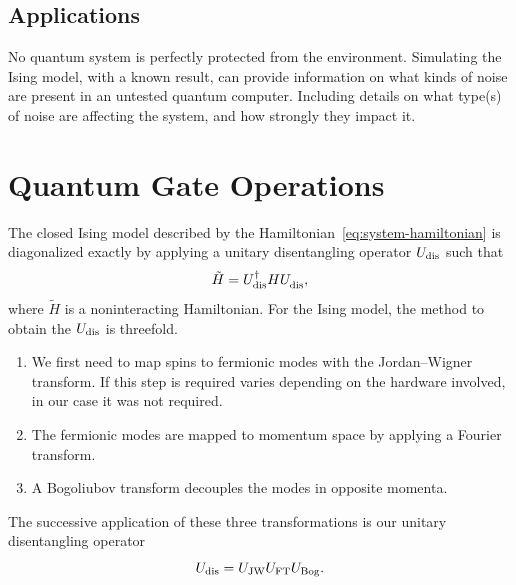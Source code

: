 \documentclass[12pt, twocolumn]{article}
\begin{document}
  \subsection{Applications}
  No quantum system is perfectly protected from the environment. Simulating the Ising model, with a known result, can provide information on what kinds of noise are present in an untested quantum computer. Including details on what type(s) of noise are affecting the system, and how strongly they impact it.

  \section{Quantum Gate Operations}
  The closed Ising model described by the Hamiltonian~\eqref{eq:system-hamiltonian} is diagonalized exactly by applying a unitary disentangling operator \( U_{\textnormal{dis}} \) such that
  \begin{equation}
    \tilde{H}
      = U_{\textnormal{dis}}^{\dagger} H
        U_{\textnormal{dis}}^{\vphantom{\dagger}},
  \end{equation}
  where \( \tilde{H} \) is a noninteracting Hamiltonian. For the Ising model, the method to obtain the \( U_{\textnormal{dis}} \) is threefold.
  \begin{enumerate}
    \item We first need to map spins to fermionic modes with the Jordan--Wigner transform. If this step is required varies depending on the hardware involved, in our case it was not required. %
    \item The fermionic modes are mapped to momentum space by applying a Fourier transform.
    \item A Bogoliubov transform decouples the modes in opposite momenta.
  \end{enumerate}
  The successive application of these three transformations is our unitary disentangling operator
  \begin{equation}
    U_{\textnormal{dis}}
      = U_{\textnormal{JW}} U_{\textnormal{FT}} U_{\textnormal{Bog}}.
  \end{equation}
\end{document}
